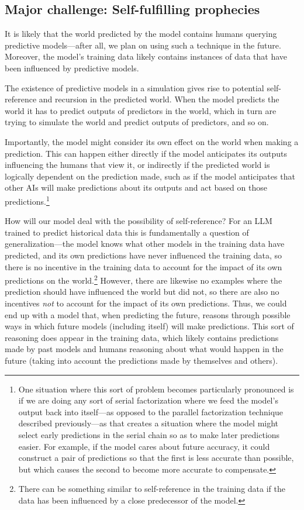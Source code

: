 \documentclass[
  onecolumn,
  natbib,
]{miri-tech-article}
\begin{document}
\subsection{Major challenge: Self-fulfilling prophecies}
\label{sec:2d}

It is likely that the world predicted by the model contains humans querying predictive models---after all, we plan on using such a technique in the future. Moreover, the model's training data likely contains instances of data that have been influenced by predictive models.

The existence of predictive models in a simulation gives rise to potential self-reference and recursion in the predicted world. When the model predicts the world it has to predict outputs of predictors in the world, which in turn are trying to simulate the world and predict outputs of predictors, and so on.

Importantly, the model might consider its own effect on the world when making a prediction. This can happen either directly if the model anticipates its outputs influencing the humans that view it, or indirectly if the predicted world is logically dependent on the prediction made, such as if the model anticipates that other AIs will make predictions about its outputs and act based on those predictions.\footnote{One situation where this sort of problem becomes particularly pronounced is if we are doing any sort of serial factorization where we feed the model's output back into itself---as opposed to the parallel factorization technique described previously---as that creates a situation where the model might select early predictions in the serial chain so as to make later predictions easier. For example, if the model cares about future accuracy, it could construct a pair of predictions so that the first is less accurate than possible, but which causes the second to become more accurate to compensate.}

How will our model deal with the possibility of self-reference? For an LLM trained to predict historical data this is fundamentally a question of generalization---the model knows what other models in the training data have predicted, and its own predictions have never influenced the training data, so there is no incentive in the training data to account for the impact of its own predictions on the world.\footnote{There can be something similar to self-reference in the training data if the data has been influenced by a close predecessor of the model.} However, there are likewise no examples where the prediction should have influenced the world but did not, so there are also no incentives \textit{not} to account for the impact of its own predictions. Thus, we could end up with a model that, when predicting the future, reasons through possible ways in which future models (including itself) will make predictions. This sort of reasoning does appear in the training data, which likely contains predictions made by past models and humans reasoning about what would happen in the future (taking into account the predictions made by themselves and others).
\end{document}
